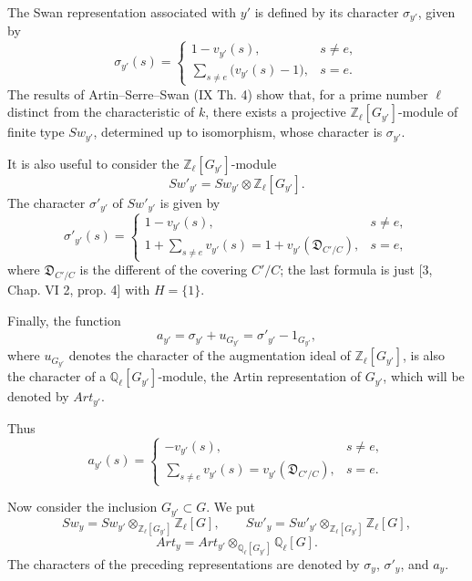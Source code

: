 \documentclass[11pt]{article}
\begin{document}
The Swan representation associated with $y'$ is defined by its character $\sigma_{y'}$, given by
\[
\sigma_{y'}(s)=
\begin{cases}
1-v_{y'}(s),& s\ne e,\\[0.4em]
\displaystyle\sum_{s\ne e}\bigl(v_{y'}(s)-1\bigr),& s=e.
\end{cases}
\tag{4.2.2}\label{sga5:X:equation:4.2.2}
\]
The results of Artin--Serre--Swan (IX Th. 4) show that, for a prime number $\ell$ distinct from the characteristic of $k$, there exists a projective $\mathbb Z_\ell[G_{y'}]$-module of finite type $Sw_{y'}$, determined up to isomorphism, whose character is $\sigma_{y'}$.

It is also useful to consider the $\mathbb Z_\ell[G_{y'}]$-module
\[
Sw'_{y'}=Sw_{y'}\otimes\mathbb Z_\ell[G_{y'}].
\tag{4.2.3}\label{sga5:X:equation:4.2.3}
\]
The character $\sigma'_{y'}$ of $Sw'_{y'}$ is given by
\[
\sigma'_{y'}(s)=
\begin{cases}
1-v_{y'}(s),& s\ne e,\\[0.4em]
\displaystyle 1+\sum_{s\ne e}v_{y'}(s)
=1+v_{y'}(\mathfrak D_{C'/C}),& s=e,
\end{cases}
\tag{4.2.4}\label{sga5:X:equation:4.2.4}
\]
where $\mathfrak D_{C'/C}$ is the different of the covering $C'/C$; the last formula is just [3, Chap. VI 2, prop. 4] with $H=\{1\}$.

Finally, the function
\[
a_{y'}=\sigma_{y'}+u_{G_{y'}}=\sigma'_{y'}-1_{G_{y'}},
\tag{4.2.5}\label{sga5:X:equation:4.2.5}
\]
where $u_{G_{y'}}$ denotes the character of the augmentation ideal of $\mathbb Z_\ell[G_{y'}]$, is also the character of a $\mathbb Q_\ell[G_{y'}]$-module, the Artin representation of $G_{y'}$, which will be denoted by $Art_{y'}$.

Thus
\[
a_{y'}(s)=
\begin{cases}
-v_{y'}(s),& s\ne e,\\[0.4em]
\displaystyle\sum_{s\ne e}v_{y'}(s)=v_{y'}(\mathfrak D_{C'/C}),& s=e.
\end{cases}
\tag{4.2.6}\label{sga5:X:equation:4.2.6}
\]

Now consider the inclusion $G_{y'}\subset G$. We put
\[
Sw_y=Sw_{y'}\otimes_{\mathbb Z_\ell[G_{y'}]}\mathbb Z_\ell[G],
\qquad
Sw'_y=Sw'_{y'}\otimes_{\mathbb Z_\ell[G_{y'}]}\mathbb Z_\ell[G],
\tag{4.2.7}\label{sga5:X:equation:4.2.7}
\]
\[
Art_y=Art_{y'}\otimes_{\mathbb Q_\ell[G_{y'}]}\mathbb Q_\ell[G].
\tag{4.2.8}\label{sga5:X:equation:4.2.8}
\]
The characters of the preceding representations are denoted by $\sigma_y$, $\sigma'_y$, and $a_y$.
\end{document}
